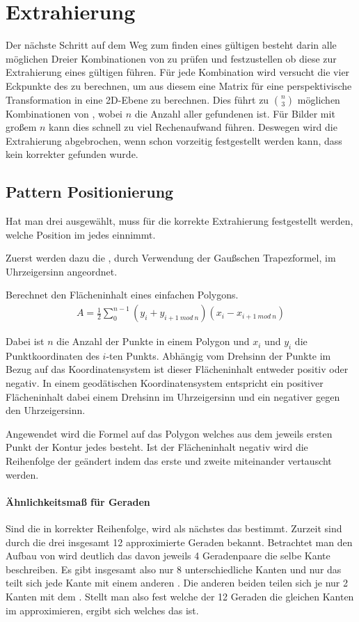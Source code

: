 \chapter{Extrahierung}

Der nächste Schritt auf dem Weg zum finden eines gültigen \QRCodes besteht darin alle möglichen Dreier Kombinationen von \fps zu prüfen und festzustellen ob diese zur Extrahierung eines gültigen \QRCodes führen. Für jede Kombination wird versucht die vier Eckpunkte des \QRCodes zu berechnen, um aus diesem eine Matrix für eine perspektivische Transformation in eine 2D-Ebene zu berechnen. Dies führt zu $\binom{n}{3}$ möglichen Kombinationen von \fps, wobei $n$ die Anzahl aller gefundenen \fps ist. Für Bilder mit großem $n$ kann dies schnell zu viel Rechenaufwand führen. Deswegen wird die Extrahierung abgebrochen, wenn schon vorzeitig festgestellt werden kann, dass kein korrekter \QRCode gefunden wurde.

\section{Pattern Positionierung}
Hat man drei \fps ausgewählt, muss für die korrekte Extrahierung festgestellt werden, welche Position im \QRCode jedes \fp einnimmt.

Zuerst werden dazu die \fps, durch Verwendung der Gaußschen Trapezformel, im Uhrzeigersinn angeordnet.
\begin{theorem}
Berechnet den Flächeninhalt eines einfachen Polygons.
\begin{align}
A=\frac{1}{2} \sum_{0}^{n-1} (y_i + y_{i+1\ mod\ n})(x_i - x_{i+1\ mod\ n})
\end{align}
\end{theorem}
Dabei ist $n$ die Anzahl der Punkte in einem Polygon und $x_i$ und $y_i$ die Punktkoordinaten des $i$-ten Punkts. Abhängig vom Drehsinn der Punkte im Bezug auf das Koordinatensystem ist dieser Flächeninhalt entweder positiv oder negativ. In einem geodätischen Koordinatensystem entspricht ein positiver Flächeninhalt dabei einem Drehsinn im Uhrzeigersinn und ein negativer gegen den Uhrzeigersinn.

Angewendet wird die Formel auf das Polygon welches aus dem jeweils ersten Punkt der Kontur jedes \fps besteht. Ist der Flächeninhalt negativ wird die Reihenfolge der \fps geändert indem das erste und zweite \fp miteinander vertauscht werden.
\subsubsection{Ähnlichkeitsmaß für Geraden}
Sind die \fps in korrekter Reihenfolge, wird als nächstes das \olfp bestimmt. Zurzeit sind durch die drei \fps insgesamt 12 approximierte Geraden bekannt. Betrachtet man den Aufbau von \QRCodes wird deutlich das davon jeweils 4 Geradenpaare die selbe Kante beschreiben. Es gibt insgesamt also nur 8 unterschiedliche Kanten und nur das \olfp teilt sich jede Kante mit einem anderen \fp. Die anderen beiden \fps teilen sich je nur 2 Kanten mit dem \olfp. Stellt man also fest welche der 12 Geraden die gleichen Kanten im \QRCode approximieren, ergibt sich welches \fp das \olfp ist.

